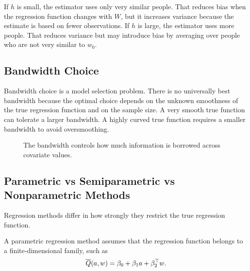 If $h$ is small, the estimator uses only very similar people. That reduces bias when
the regression function changes with $W$, but it increases variance because the
estimate is based on fewer observations. If $h$ is large, the estimator uses more
people. That reduces variance but may introduce bias by averaging over people who are
not very similar to $w_0$.

\subsection{Bandwidth Choice}

Bandwidth choice is a model selection problem. There is no universally best
bandwidth because the optimal choice depends on the unknown smoothness of the true
regression function and on the sample size. A very smooth true function can tolerate a
larger bandwidth. A highly curved true function requires a smaller bandwidth to avoid
oversmoothing.

\begin{figure}[H]
\centering
{}
\caption{The bandwidth controls how much information is borrowed across covariate values.}
\label{fig:ch5-bandwidth}
\end{figure}

\subsection{Parametric vs Semiparametric vs Nonparametric Methods}

Regression methods differ in how strongly they restrict the true regression function.

\begin{definition}
A parametric regression method assumes that the regression function belongs to a
finite-dimensional family, such as
\[
\overline{Q}(a,w)=\beta_0+\beta_1a+\beta_2^\top w.
\]
\end{definition}

